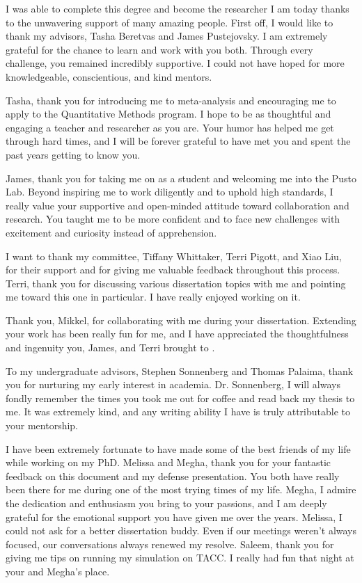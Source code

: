 I was able to complete this degree and become the researcher I am today thanks to the unwavering support of many amazing people. First off, I would like to thank my advisors, Tasha Beretvas and James Pustejovsky. I am extremely grateful for the chance to learn and work with you both. Through every challenge, you remained incredibly supportive. I could not have hoped for more knowledgeable, conscientious, and kind mentors. 

Tasha, thank you for introducing me to meta-analysis and encouraging me to apply to the Quantitative Methods program. I hope to be as thoughtful and engaging a teacher and researcher as you are. Your humor has helped me get through hard times, and I will be forever grateful to have met you and spent the past years getting to know you. 

James, thank you for taking me on as a student and welcoming me into the Pusto Lab. Beyond inspiring me to work diligently and to uphold high standards, I really value your supportive and open-minded attitude toward collaboration and research. You taught me to be more confident and to face new challenges with excitement and curiosity instead of apprehension. 

I want to thank my committee, Tiffany Whittaker, Terri Pigott, and Xiao Liu, for their support and for giving me valuable feedback throughout this process. Terri, thank you for discussing various dissertation topics with me and pointing me toward this one in particular. I have really enjoyed working on it. 

Thank you, Mikkel, for collaborating with me during your dissertation. Extending your work has been really fun for me, and I have appreciated the thoughtfulness and ingenuity you, James, and Terri brought to \textcite{vembye2023}.

To my undergraduate advisors, Stephen Sonnenberg and Thomas Palaima, thank you for nurturing my early interest in academia. Dr. Sonnenberg, I will always fondly remember the times you took me out for coffee and read back my thesis to me. It was extremely kind, and any writing ability I have is truly attributable to your mentorship. 

I have been extremely fortunate to have made some of the best friends of my life while working on my PhD. Melissa and Megha, thank you for your fantastic feedback on this document and my defense presentation. You both have really been there for me during one of the most trying times of my life. Megha, I admire the dedication and enthusiasm you bring to your passions, and I am deeply grateful for the emotional support you have given me over the years. Melissa, I could not ask for a better dissertation buddy. Even if our meetings weren't always focused, our conversations always renewed my resolve. Saleem, thank you for giving me tips on running my simulation on TACC. I really had fun that night at your and Megha's place. 


